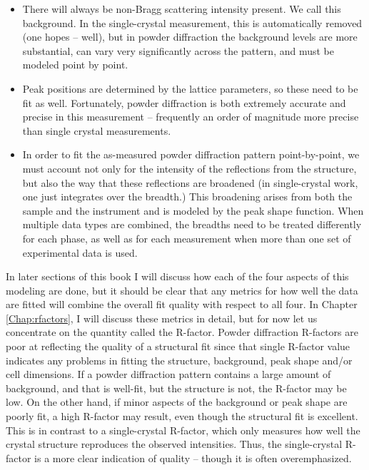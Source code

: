 \begin{itemize}

    \item There will always be non-Bragg scattering intensity present. We call this background. In the single-crystal measurement, this is automatically removed (one hopes -- well), but in powder diffraction the background levels are more substantial, can vary very significantly across the pattern, and must be modeled point by point. 

    \item  Peak positions are determined by the lattice parameters, so these need to be fit as well. Fortunately, powder diffraction is both extremely accurate and precise in this measurement – frequently an order of magnitude more precise than single crystal measurements. 
    
    \item In order to fit the as-measured powder diffraction pattern point-by-point, we must account not only for the intensity of the reflections from the structure, but also the way that these reflections are broadened (in single-crystal work, one just integrates over the breadth.) This broadening arises from both the sample and the instrument and is modeled by the peak shape function. When multiple data types are combined, the breadths need to be treated differently for each phase, as well as for each measurement when more than one set of experimental data is used. 

\end{itemize}

In later sections of this book I will discuss how each of the four aspects of this modeling are done, but it should be clear that any metrics for how well the data are fitted will combine the overall fit quality with respect to all four. In Chapter \ref{Chap:rfactors}, I will discuss these metrics in detail, but for now let us concentrate on the quantity called the R-factor. 
Powder diffraction R-factors are poor at reflecting the quality of a structural fit since that single R-factor value indicates any problems in fitting the structure, background, peak shape and/or cell dimensions. If a powder diffraction pattern contains a large amount of background, and that is well-fit, but the structure is not, the R-factor may be low. On the other hand, if minor aspects of the background or peak shape are poorly fit, a high R-factor may result, even though the structural fit is excellent. This is in contrast to a single-crystal R-factor, which only measures how well the crystal structure reproduces the observed intensities. Thus, the single-crystal R-factor is a more clear indication of quality – though it is often overemphasized. 

